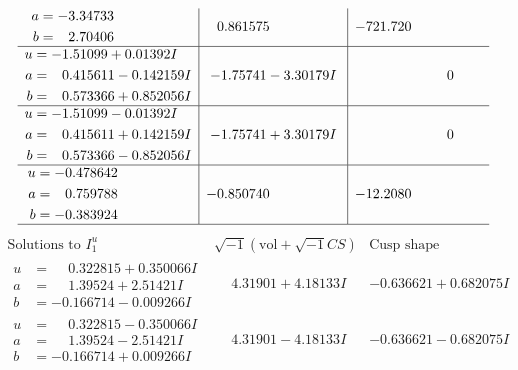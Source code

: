 \documentclass[1p]{elsarticle_modified}
\theoremstyle{definition}
\newcommand{\I}{\sqrt{-1}}
\begin{document}
$$\begin{array}{c|c|c}
\begin{aligned}
a &= -3.34733\phantom{ +0.000000I} \\
b &= \phantom{-}2.70406\phantom{ +0.000000I}\end{aligned}
 & \phantom{-}0.861575\phantom{ +0.000000I} & -721.720\phantom{ +0.000000I} \\ \hline\begin{aligned}
u &= -1.51099 + 0.01392 I \\
a &= \phantom{-}0.415611 - 0.142159 I \\
b &= \phantom{-}0.573366 + 0.852056 I\end{aligned}
 & -1.75741 - 3.30179 I & \phantom{-0.000000 } 0 \\ \hline\begin{aligned}
u &= -1.51099 - 0.01392 I \\
a &= \phantom{-}0.415611 + 0.142159 I \\
b &= \phantom{-}0.573366 - 0.852056 I\end{aligned}
 & -1.75741 + 3.30179 I & \phantom{-0.000000 } 0 \\ \hline\begin{aligned}
u &= -0.478642\phantom{ +0.000000I} \\
a &= \phantom{-}0.759788\phantom{ +0.000000I} \\
b &= -0.383924\phantom{ +0.000000I}\end{aligned}
 & -0.850740\phantom{ +0.000000I} & -12.2080\phantom{ +0.000000I}\\
 \hline 
 \end{array}$$\newpage$$\begin{array}{c|c|c}  
\text{Solutions to }I^u_{1}& \I (\text{vol} + \sqrt{-1}CS) & \text{Cusp shape}\\
 \hline 
\begin{aligned}
u &= \phantom{-}0.322815 + 0.350066 I \\
a &= \phantom{-}1.39524 + 2.51421 I \\
b &= -0.166714 - 0.009266 I\end{aligned}
 & \phantom{-}4.31901 + 4.18133 I & -0.636621 + 0.682075 I \\ \hline\begin{aligned}
u &= \phantom{-}0.322815 - 0.350066 I \\
a &= \phantom{-}1.39524 - 2.51421 I \\
b &= -0.166714 + 0.009266 I\end{aligned}
 & \phantom{-}4.31901 - 4.18133 I & -0.636621 - 0.682075 I \\ \hline\begin{aligned}

\end{aligned}
\end{array}$$
\end{document}
